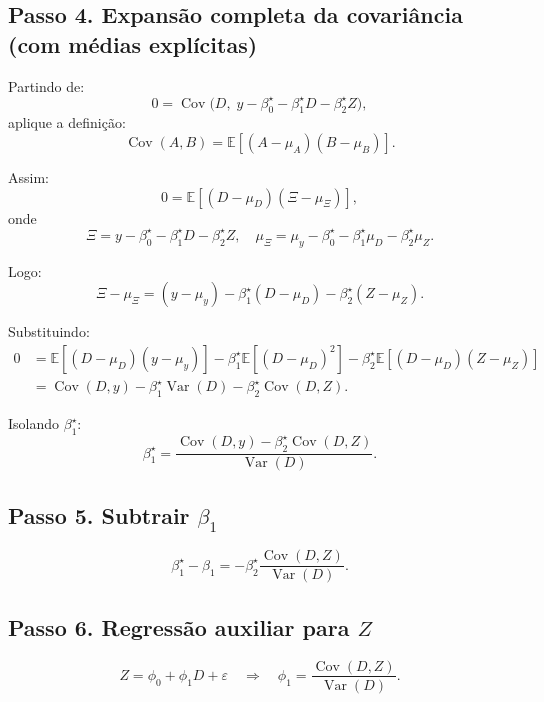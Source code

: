 \documentclass[
]{article}
\begin{document}
\subsection{Passo 4. Expansão completa da covariância (com médias
explícitas)}\label{passo-4.-expansuxe3o-completa-da-covariuxe2ncia-com-muxe9dias-expluxedcitas}

Partindo de: \[
0=\operatorname{Cov}\!\big(D,\;y-\beta_0^\star-\beta_1^\star D-\beta_2^\star Z\big),
\] aplique a definição: \[
\operatorname{Cov}(A,B)=\mathbb{E}\!\left[(A-\mu_A)(B-\mu_B)\right].
\]

Assim: \[
0=\mathbb{E}\!\left[(D-\mu_D)\left(\Xi-\mu_\Xi\right)\right],
\] onde \[
\Xi=y-\beta_0^\star-\beta_1^\star D-\beta_2^\star Z,
\quad
\mu_\Xi=\mu_y-\beta_0^\star-\beta_1^\star\mu_D-\beta_2^\star\mu_Z.
\]

Logo: \[
\Xi-\mu_\Xi
=(y-\mu_y)-\beta_1^\star(D-\mu_D)-\beta_2^\star(Z-\mu_Z).
\]

Substituindo: \begin{align*}
0
&=
\mathbb{E}\!\left[(D-\mu_D)(y-\mu_y)\right]
-\beta_1^\star\mathbb{E}\!\left[(D-\mu_D)^2\right]
-\beta_2^\star\mathbb{E}\!\left[(D-\mu_D)(Z-\mu_Z)\right] \\
&=
\operatorname{Cov}(D,y)-\beta_1^\star\operatorname{Var}(D)-\beta_2^\star\operatorname{Cov}(D,Z).
\end{align*}

Isolando \(\beta_1^\star\): \[
\beta_1^\star
=
\frac{\operatorname{Cov}(D,y)-\beta_2^\star\operatorname{Cov}(D,Z)}
{\operatorname{Var}(D)}.
\]

\subsection{\texorpdfstring{Passo 5. Subtrair
\(\beta_1\)}{Passo 5. Subtrair \textbackslash beta\_1}}\label{passo-5.-subtrair-beta_1}

\[
\beta_1^\star-\beta_1
=
-\beta_2^\star\frac{\operatorname{Cov}(D,Z)}{\operatorname{Var}(D)}.
\]

\subsection{\texorpdfstring{Passo 6. Regressão auxiliar para
\(Z\)}{Passo 6. Regressão auxiliar para Z}}\label{passo-6.-regressuxe3o-auxiliar-para-z}

\[
Z=\phi_0+\phi_1 D+\varepsilon
\quad\Rightarrow\quad
\phi_1=\frac{\operatorname{Cov}(D,Z)}{\operatorname{Var}(D)}.
\]
\end{document}
